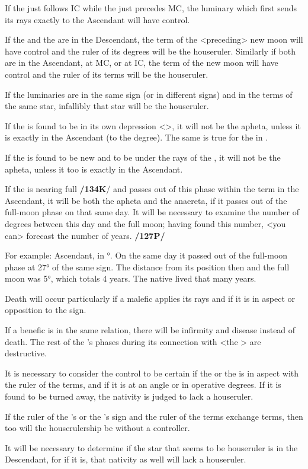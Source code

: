 If the \Sun\xspace just follows IC while the \Moon\xspace just
precedes MC, the luminary which first sends its rays exactly to the Ascendant will have control. 

If the \Sun\xspace and the \Moon\xspace are in the Descendant, the term of the <preceding> new moon will have control and the ruler of its degrees will be the houseruler. Similarly if both are in the Ascendant, at MC, or at IC, the term of the new moon will have control and the ruler of its terms will be the houseruler. 

If the luminaries are in the same sign (or in different signs) and in the terms of the same star, infallibly that star will be the houseruler.

If the \Sun\xspace is found to be in its own depression <\Libra>, it will not be the apheta, unless it is exactly in
the Ascendant (to the degree). The same is true for the \Moon\xspace in \Scorpio\xspace <its depression>. 

If the \Moon\xspace is found to be new and to be under the rays of the \Sun, it will not be the apheta, unless it too is exactly in the Ascendant.

If the \Moon\xspace is nearing full \textbf{/134K}/ and passes out of this phase within the term in the Ascendant, it will be both the apheta and the anaereta, if it passes out of the full-moon phase on that same day. It will be necessary to examine the number of degrees between this day and the full moon; having found this number, <you can> forecast the number of years. \textbf{/127P/}

For example: Ascendant, \Moon\xspace in °. On the same
day it passed out of the full-moon phase at 27° of the same sign. The distance from its position then and the full moon was 5°, which totals 4 years. The native lived that many years.

Death will occur particularly if a malefic applies its rays and if it is in aspect or opposition to the sign.

If a benefic is in the same relation, there will be infirmity and disease instead of death. The rest of the \Moon’s phases during its connection with <the \Sun> are destructive.

It is necessary to consider the control to be certain if the \Sun\xspace or the \Moon\xspace is in aspect with the ruler of the terms, and if it is at an angle or in operative degrees. If it is found to be turned away, the nativity is judged to lack a houseruler. 

If the ruler of the \Sun’s or the \Moon’s sign and the ruler of the terms exchange terms, then too will the houserulership be without a controller. 

It will be necessary to determine if the star that seems to be houseruler is in the Descendant, for if it is, that nativity as well will lack a houseruler.

\newpage